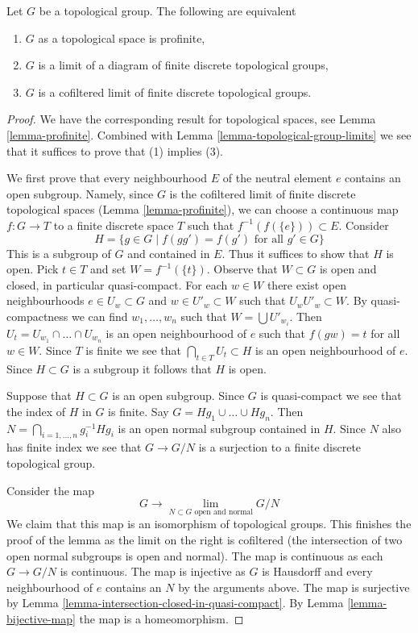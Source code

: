 \begin{lemma}
\label{lemma-profinite-group}
Let $G$ be a topological group. The following are equivalent
\begin{enumerate}
\item $G$ as a topological space is profinite,
\item $G$ is a limit of a diagram of finite discrete topological groups,
\item $G$ is a cofiltered limit of finite discrete topological groups.
\end{enumerate}
\end{lemma}

\begin{proof}
We have the corresponding result for topological spaces, see
Lemma \ref{lemma-profinite}. Combined with
Lemma \ref{lemma-topological-group-limits}
we see that it suffices to prove that (1) implies (3).

\medskip\noindent
We first prove that every neighbourhood $E$ of the neutral element $e$ contains
an open subgroup. Namely, since $G$ is the cofiltered limit of finite
discrete topological spaces (Lemma \ref{lemma-profinite}),
we can choose a continuous map $f : G \to T$ to a finite discrete
space $T$ such that $f^{-1}(f(\{e\})) \subset E$.
Consider
$$
H = \{g \in G \mid f(gg') = f(g')\text{ for all }g' \in G\}
$$
This is a subgroup of $G$ and contained in $E$. Thus it suffices to
show that $H$ is open. Pick $t \in T$ and set $W = f^{-1}(\{t\})$.
Observe that $W \subset G$ is open and closed, in particular quasi-compact.
For each $w \in W$ there exist open neighbourhoods $e \in U_w \subset G$
and $w \in U'_w \subset W$ such that $U_wU'_w \subset W$.
By quasi-compactness we can find $w_1, \ldots, w_n$ such that
$W = \bigcup U'_{w_i}$. Then
$U_t = U_{w_1} \cap \ldots \cap U_{w_n}$ is an open neighbourhood
of $e$ such that $f(gw) = t$ for all $w \in W$.
Since $T$ is finite we see that $\bigcap_{t \in T} U_t \subset H$
is an open neighbourhood of $e$. Since $H \subset G$ is a subgroup
it follows that $H$ is open.

\medskip\noindent
Suppose that $H \subset G$ is an open subgroup. Since $G$ is quasi-compact
we see that the index of $H$ in $G$ is finite. Say
$G = Hg_1 \cup \ldots \cup Hg_n$. Then
$N = \bigcap_{i = 1, \ldots, n} g_i^{-1}Hg_i$ is
an open normal subgroup contained in $H$. Since $N$ also has finite
index we see that $G \to G/N$ is a surjection to a finite discrete
topological group.

\medskip\noindent
Consider the map
$$
G \longrightarrow \lim_{N \subset G\text{ open and normal}} G/N
$$
We claim that this map is an isomorphism of topological groups.
This finishes the proof of the lemma as the limit on the right
is cofiltered (the intersection of two open normal subgroups is
open and normal). The map is continuous as each $G \to G/N$ is continuous.
The map is injective as $G$ is Hausdorff and every neighbourhood
of $e$ contains an $N$ by the arguments above.
The map is surjective by
Lemma \ref{lemma-intersection-closed-in-quasi-compact}.
By Lemma \ref{lemma-bijective-map} the map is a homeomorphism.
\end{proof}

